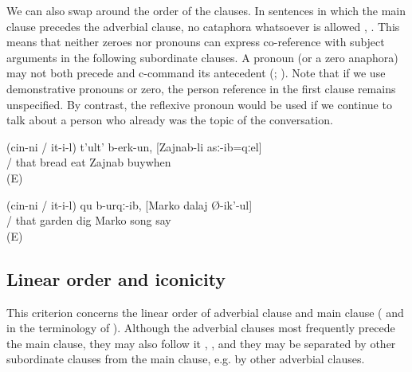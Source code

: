 We can also swap around the order of the clauses. In sentences in which the main clause precedes the adverbial clause, no cataphora whatsoever is allowed , . This means that neither zeroes nor pronouns can express co-reference with subject arguments in the following subordinate clauses. A pronoun (or a zero anaphora) may not both precede and c-command its antecedent (\citealp[185]{Langacker1969}; \citealp[8]{Reinhart1976}). Note that if we use demonstrative pronouns or zero, the person reference in the first clause remains unspecified. By contrast, the reflexive pronoun would be used if we continue to talk about a person who already was the topic of the conversation.
%
\begin{exe}
	\ex	\label{ex:S/he ate the bread when Zainab bought it}
	\gll	(cin-ni	/	it-i-l)	t'ult'	b-erk-un,	[Zajnab-li	asː-ib=qːel]\\
			/	that	bread	eat	Zajnab	buywhen\\
	\glt	{} (E)

	\ex	\label{ex:While Zapir was singing a song}
	\gll	(cin-ni	/	it-i-l)	qu	b-urqː-ib, 	[Marko	dalaj	Ø-ik'-ul]\\
			/	that	garden	dig	Marko	song	say\\
	\glt	{} (E)
\end{exe}



\subsection{Linear order and iconicity}
\label{ssec:Linear order and iconicity}

This criterion concerns the linear order of adverbial clause and main clause ( and  in the terminology of \citealp{Bickel2010}). Although the adverbial clauses most frequently precede the main clause, they may also follow it , , and they may be separated by other subordinate clauses from the main clause, e.g. by other adverbial clauses.

